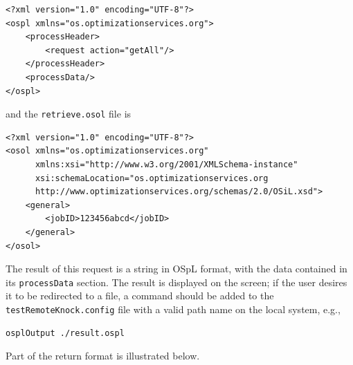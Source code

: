 
\begin{verbatim}
<?xml version="1.0" encoding="UTF-8"?>
<ospl xmlns="os.optimizationservices.org">
    <processHeader>
        <request action="getAll"/>
    </processHeader>
    <processData/>
</ospl>
\end{verbatim}
and the {\tt retrieve.osol} file is
\begin{verbatim}
<?xml version="1.0" encoding="UTF-8"?>
<osol xmlns="os.optimizationservices.org"
      xmlns:xsi="http://www.w3.org/2001/XMLSchema-instance"
      xsi:schemaLocation="os.optimizationservices.org
      http://www.optimizationservices.org/schemas/2.0/OSiL.xsd">
    <general>
        <jobID>123456abcd</jobID>
    </general>
</osol>
\end{verbatim}

The result of this request is a string in OSpL format, with the data contained in its
{\tt processData} section.  The result is displayed on the screen; if the user desires it
to be redirected to a file, a command should be added to the {\tt testRemoteKnock.config}
file with a valid path name on the local system, e.g.,

\begin{verbatim}
osplOutput ./result.ospl
\end{verbatim}

Part of the return format is illustrated below.



